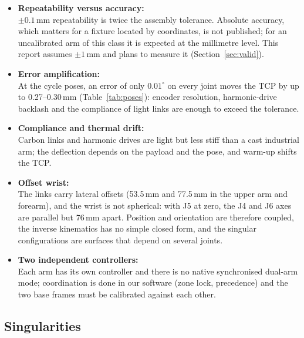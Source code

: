 \documentclass[11pt,a4paper]{article}
\begin{document}
\begin{itemize}
  \item \textbf{Repeatability versus accuracy:}\\ $\pm0.1$\,mm repeatability is twice the assembly
        tolerance. Absolute accuracy, which matters for a fixture located by coordinates, is not
        published; for an uncalibrated arm of this class it is expected at the millimetre level.
        This report assumes $\pm1$\,mm and plans to measure it (Section~\ref{sec:valid}).
  \item \textbf{Error amplification:}\\ At the cycle poses, an error of only $0.01^\circ$ on every
        joint moves the TCP by up to 0.27--0.30\,mm (Table~\ref{tab:poses}): encoder resolution,
        harmonic-drive backlash and the compliance of light links are enough to exceed the
        tolerance.
  \item \textbf{Compliance and thermal drift:}\\ Carbon links and harmonic drives are light but less
        stiff than a cast industrial arm; the deflection depends on the payload and the pose,
        and warm-up shifts the TCP.
  \item \textbf{Offset wrist:}\\ The links carry lateral offsets (53.5\,mm and 77.5\,mm in the
        upper arm and forearm), and the wrist is not spherical: with J5 at zero, the J4 and J6
        axes are parallel but 76\,mm apart. Position and orientation are therefore coupled, the
        inverse kinematics has no simple closed form, and the singular configurations are
        surfaces that depend on several joints.
  \item \textbf{Two independent controllers:}\\ Each arm has its own controller and there is no
        native synchronised dual-arm mode; coordination is done in our software (zone lock,
        precedence) and the two base frames must be calibrated against each other.
\end{itemize}

\subsection{Singularities}
\end{document}
